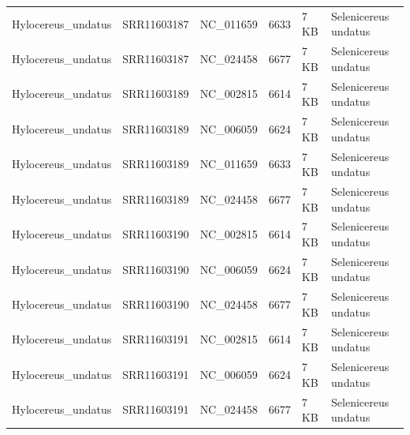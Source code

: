 \documentclass[fleqn,10pt,lineno]{wlpeerj}
\begin{document}
\begin{table}[ht]
{\begin{tabular}{@{}llllll@{}}
Hylocereus\_undatus    & SRR11603187  & NC\_011659              & 6633            & 7 KB & Selenicereus undatus    \\
Hylocereus\_undatus    & SRR11603187  & NC\_024458              & 6677            & 7 KB & Selenicereus undatus    \\
Hylocereus\_undatus    & SRR11603189  & NC\_002815              & 6614            & 7 KB & Selenicereus undatus    \\
Hylocereus\_undatus    & SRR11603189  & NC\_006059              & 6624            & 7 KB & Selenicereus undatus    \\
Hylocereus\_undatus    & SRR11603189  & NC\_011659              & 6633            & 7 KB & Selenicereus undatus    \\
Hylocereus\_undatus    & SRR11603189  & NC\_024458              & 6677            & 7 KB & Selenicereus undatus    \\
Hylocereus\_undatus    & SRR11603190  & NC\_002815              & 6614            & 7 KB & Selenicereus undatus    \\
Hylocereus\_undatus    & SRR11603190  & NC\_006059              & 6624            & 7 KB & Selenicereus undatus    \\
Hylocereus\_undatus    & SRR11603190  & NC\_024458              & 6677            & 7 KB & Selenicereus undatus    \\
Hylocereus\_undatus    & SRR11603191  & NC\_002815              & 6614            & 7 KB & Selenicereus undatus    \\
Hylocereus\_undatus    & SRR11603191  & NC\_006059              & 6624            & 7 KB & Selenicereus undatus    \\
Hylocereus\_undatus    & SRR11603191  & NC\_024458              & 6677            & 7 KB & Selenicereus undatus    \\ \bottomrule
\end{tabular}}
\end{table}


\clearpage
\end{document}
